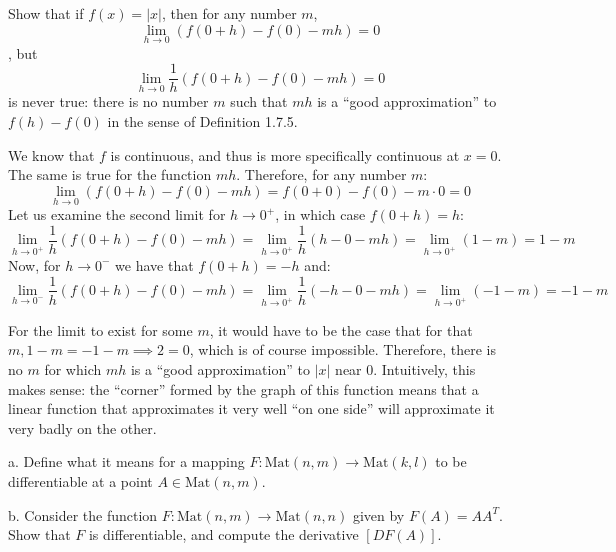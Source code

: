\newpage

\begin{exercise}{13}
    Show that if $f(x) = \lvert x \rvert$, then for any number $m$,
    $$\lim_{h \rightarrow 0}(f(0+h) - f(0) - mh) = 0$$
    , but
    $$\lim_{h \rightarrow 0}\frac{1}{h}(f(0+h) - f(0) - mh) = 0$$
    is never true: there is no number $m$ such that $mh$ is a ``good approximation'' to $f(h) - f(0)$ in the sense of Definition 1.7.5.
\end{exercise}

\begin{solution}

    We know that $f$ is continuous, and thus is more specifically continuous at $x = 0$. The same is true for the function $mh$. Therefore, for any number $m$:
    $$\lim_{h \rightarrow 0}(f(0+h) - f(0) - mh) = f(0+0) - f(0) -m\cdot 0 = 0$$
    Let us examine the second limit for $h \rightarrow 0^+$, in which case $f(0+h) = h$:
    $$\lim_{h \rightarrow 0^+}\frac{1}{h}(f(0+h) - f(0) - mh) = \lim_{h \rightarrow 0^+}\frac{1}{h}(h - 0 - mh) = \lim_{h \rightarrow 0^+}(1 - m) = 1 - m$$
    Now, for $h \rightarrow 0^-$ we have that $f(0+h) = -h$ and:
    $$\lim_{h \rightarrow 0^-}\frac{1}{h}(f(0+h) - f(0) - mh) = \lim_{h \rightarrow 0^+}\frac{1}{h}(-h - 0 - mh) = \lim_{h \rightarrow 0^+}(-1 - m) = -1 - m$$    

    For the limit to exist for some $m$, it would have to be the case that for that $m, 1 - m = -1 -m \implies 2 = 0$, which is of course impossible. Therefore, there is no $m$ for which $mh$ is a ``good approximation'' to $\lvert x \rvert$ near 0. Intuitively, this makes sense: the ``corner'' formed by the graph of this function means that a linear function that approximates it very well ``on one side'' will approximate it very badly on the other.
\end{solution}

\begin{exercise}{15}
    a. Define what it means for a mapping $F: \text{Mat}(n, m) \rightarrow \text{Mat}(k, l)$ to be differentiable at a point $A \in \text{Mat}(n, m)$.

    b. Consider the function $F: \text{Mat}(n, m) \rightarrow \text{Mat}(n, n)$ given by $F(A) = AA^T$. Show that $F$ is differentiable, and compute the derivative $[D F(A)]$.
\end{exercise}

